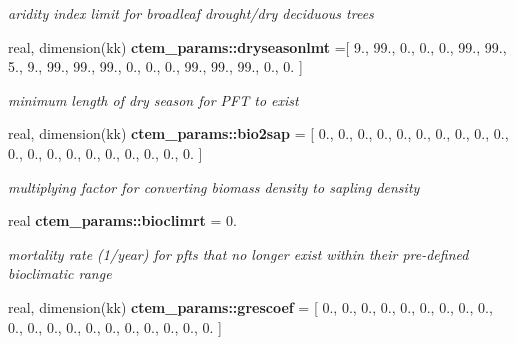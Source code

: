 \begin{DoxyCompactItemize}
\begin{DoxyCompactList}\small\item\em aridity index limit for broadleaf drought/dry deciduous trees \end{DoxyCompactList}\item 
\hypertarget{namespacectem__params_af24fc4b3d8a43b3a8660e97fb81bce30}{}real, dimension(kk) {\bfseries ctem\+\_\+params\+::dryseasonlmt} =\mbox{[} 9., 99., 0., 0., 0., 99., 99., 5., 9., 99., 99., 99., 0., 0., 0., 99., 99., 99., 0., 0. \mbox{]}\label{namespacectem__params_af24fc4b3d8a43b3a8660e97fb81bce30}

\begin{DoxyCompactList}\small\item\em minimum length of dry season for P\+F\+T to exist \end{DoxyCompactList}\item 
\hypertarget{namespacectem__params_ad97be0dd9fb2c81974e6cb42433869ef}{}real, dimension(kk) {\bfseries ctem\+\_\+params\+::bio2sap} = \mbox{[} 0., 0., 0., 0., 0., 0., 0., 0., 0., 0., 0., 0., 0., 0., 0., 0., 0., 0., 0., 0. \mbox{]}\label{namespacectem__params_ad97be0dd9fb2c81974e6cb42433869ef}

\begin{DoxyCompactList}\small\item\em multiplying factor for converting biomass density to sapling density \end{DoxyCompactList}\item 
\hypertarget{namespacectem__params_a6b5937d5ed79accdf5415c1ab6e1bc48}{}real {\bfseries ctem\+\_\+params\+::bioclimrt} = 0.\label{namespacectem__params_a6b5937d5ed79accdf5415c1ab6e1bc48}

\begin{DoxyCompactList}\small\item\em mortality rate (1/year) for pfts that no longer exist within their pre-\/defined bioclimatic range \end{DoxyCompactList}\item 
\hypertarget{namespacectem__params_a693738e0e1e8f1ff84250383c571b23a}{}real, dimension(kk) {\bfseries ctem\+\_\+params\+::grescoef} = \mbox{[} 0., 0., 0., 0., 0., 0., 0., 0., 0., 0., 0., 0., 0., 0., 0., 0., 0., 0., 0., 0. \mbox{]}\label{namespacectem__params_a693738e0e1e8f1ff84250383c571b23a}


\end{DoxyCompactItemize}
